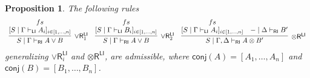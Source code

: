 \documentclass[submission,copyright,creativecommons]{eptcs}
\newtheorem{proposition}[theorem]{Proposition}
\theoremstyle{definition}
\newcommand{\tr}{\otimes \mathsf{R}}
\newcommand{\orrone}{\lor \mathsf{R}_{1}}
\newcommand{\orrtwo}{\lor \mathsf{R}_{2}}
\newcommand{\orri}{\lor \mathsf{R}_{i}}
\newcommand{\ot}{\otimes}
\newcommand{\RI}{\mathsf{RI}}
\newcommand{\LI}{\mathsf{LI}}
\newcommand{\conj}[1]{\mathsf{conj} (#1)}
\begin{document}
\begin{proposition}\label{prop:GenRightRules}
  The following rules
  \begin{displaymath}
    \begin{array}{c}
      \infer[\orrone^{\LI}]{S \mid \Gamma \vdash_{\RI} A \lor B}{
        \deduce{[S \mid \Gamma \vdash_{\LI} A_i]_{i \in [1 , \dots , n]}}{fs}
      }
      \quad
      \infer[\orrtwo^{\LI}]{S \mid \Gamma \vdash_{\RI} A \lor B}{
        \deduce{[S \mid \Gamma \vdash_{\LI} B_i]_{i \in [1 , \dots , n]}}{fs}
      }
      \quad
      \infer[\tr^{\LI}]{S \mid \Gamma , \Delta \vdash_{\RI} A \ot B'}{
        \deduce{[S \mid \Gamma \vdash_{\LI} A_i]_{i \in [1 , \dots , n]}}{fs}
        &
        - \mid \Delta \vdash_{\RI} B'
      }
    \end{array}
  \end{displaymath}
  generalizing $\orri^{\LI}$ and $\tr^{\LI}$, are admissible, where $\conj{A} = [A_1 , \dots , A_n]$ and $\conj{B} = [B_1 , \dots , B_n]$.
\end{proposition}
\end{document}
